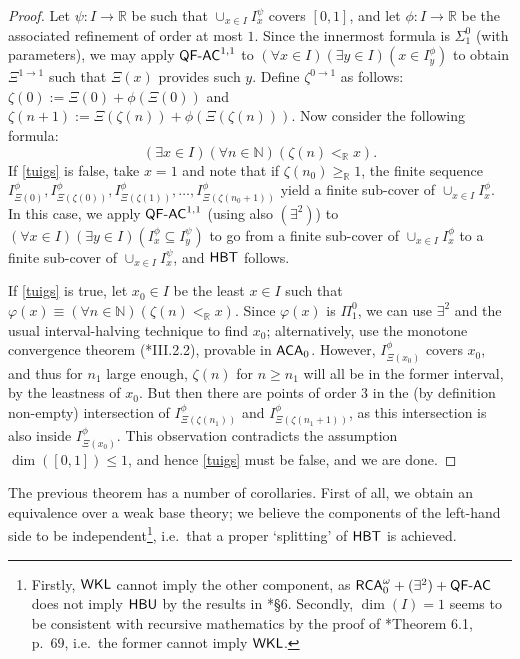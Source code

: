 \documentclass[reqno]{amsart}
\newcommand\be{\begin{equation}}
\newcommand\ee{\end{equation}}
\def\RCAo{\textup{\textsf{RCA}}_{0}^{\omega}}
\def\WKL{\textup{\textsf{WKL}}}
\def\N{{\mathbb  N}}
\def\R{{\mathbb  R}}
\def\di{\rightarrow}
\def\ACA{\textup{\textsf{ACA}}}
\def\QFAC{\textup{\textsf{QF-AC}}}
\def\HBU{\textup{\textsf{HBU}}}
\def\HBT{\textup{\textsf{HBT}}}
\numberwithin{equation}{section}
\numberwithin{thm}{section}
\begin{document}
\begin{proof}
Let $\psi:I\di \R$ be such that $\cup_{x\in I}I_{x}^{\psi}$ covers $[0, 1]$, and let $\phi:I\di \R$ be the associated refinement of order at most $1$.  
Since the innermost formula is $\Sigma_{1}^{0}$ (with parameters), we may apply $\QFAC^{1,1}$ to $(\forall x\in I)(\exists y\in I)(x\in I_{y}^{\phi})$ to obtain $\Xi^{1\di 1}$ such that $\Xi(x)$ provides such $y$.
Define $\zeta^{0\di 1}$ as follows: $\zeta(0):=\Xi(0)+ \phi(\Xi(0))$ and $\zeta(n+1):= \Xi(\zeta(n))+\phi(\Xi(\zeta(n)))$.   Now consider the following formula:
\be\label{tuigs}
(\exists x\in I )(\forall n\in \N)(\zeta(n)<_{\R}x).
\ee
If \eqref{tuigs} is false, take $x=1$ and note that if $\zeta(n_{0})\geq_{\R}1$, the finite sequence $I_{\Xi(0)}^{\phi}, I_{\Xi(\zeta(0))}^{\phi}, I_{\Xi(\zeta(1))}^{\phi}, \dots, I_{\Xi(\zeta(n_{0}+1))}^{\phi}$ yield a finite sub-cover of $\cup_{x\in I}I_{x}^{\phi}$.  In this case, we apply $\QFAC^{1,1}$ (using also $(\exists^{2})$) to $(\forall x\in I)(\exists y\in I)(I_{x}^{\phi}\subseteq I_{y}^{\psi})$ 
to go from a finite sub-cover of $\cup_{x\in I}I_{x}^{\phi}$ to a finite sub-cover of $\cup_{x\in I}I_{x}^{\psi}$, and $\HBT$ follows.  

\medskip

If \eqref{tuigs} is true, let $x_{0}\in I$ be the least $x\in I$ such that $\varphi(x)\equiv(\forall n\in \N)(\zeta(n)<_{\R}x)$.  Since $\varphi(x)$ is $\Pi_{1}^{0}$, we can use $\exists^{2}$ and the usual interval-halving technique to find $x_{0}$; alternatively, use the monotone convergence theorem (\cite{simpson2}*{III.2.2}), provable in $\ACA_{0}$.  
However, $I_{\Xi(x_{0})}^{\phi}$ covers $x_{0}$, and thus for $n_{1}$ large enough, $\zeta(n)$ for $n\geq n_{1}$ will all be in the former interval, by the leastness of $x_{0}$.  But then there are points of order $3$ in the (by definition non-empty) intersection of $I_{\Xi(\zeta(n_{1}))}^{\phi}$ and $I_{\Xi(\zeta(n_{1}+1))}^{\phi}$, as this intersection is also inside $I_{\Xi(x_{0})}^{\phi}$.  This observation contradicts the assumption $\dim([0,1])\leq1$, and hence \eqref{tuigs} must be false, and we are done.  
\end{proof}
The previous theorem has a number of corollaries.  First of all, we obtain an equivalence over a weak base theory; we believe the components of the left-hand side to be independent\footnote{Firstly, $\WKL$ cannot imply the other component, as $\RCAo+(\exists^{2})+\QFAC$ does not imply $\HBU$ by the results in \cite{dagsam}*{\S6}.  Secondly, $\dim(I)= 1$ seems to be consistent with recursive mathematics by the proof of \cite{beeson1}*{Theorem 6.1, p.\ 69}, i.e.\ the former cannot imply $\WKL$.}, i.e.\ that a proper `splitting' of $\HBT$ is achieved.
\end{document}
